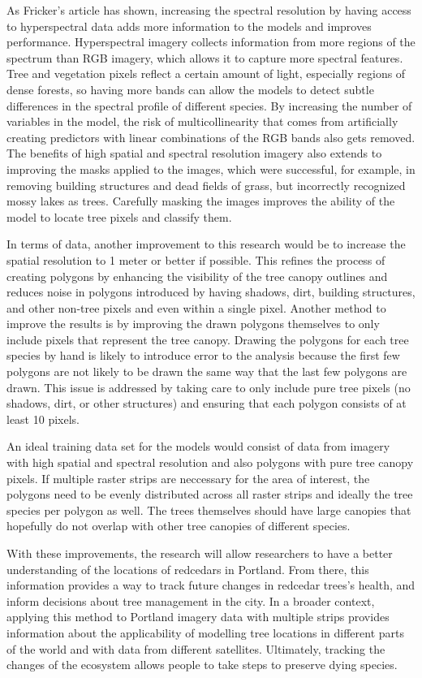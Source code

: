 \documentclass[12pt,twoside]{reedthesis}
\begin{document}
As Fricker's article has shown, increasing the spectral resolution by having access to hyperspectral data adds more information to the models and improves performance. Hyperspectral imagery collects information from more regions of the spectrum than RGB imagery, which allows it to capture more spectral features. Tree and vegetation pixels reflect a certain amount of light, especially regions of dense forests, so having more bands can allow the models to detect subtle differences in the spectral profile of different species. By increasing the number of variables in the model, the risk of multicollinearity that comes from artificially creating predictors with linear combinations of the RGB bands also gets removed. The benefits of high spatial and spectral resolution imagery also extends to improving the masks applied to the images, which were successful, for example, in removing building structures and dead fields of grass, but incorrectly recognized mossy lakes as trees. Carefully masking the images improves the ability of the model to locate tree pixels and classify them.

In terms of data, another improvement to this research would be to increase the spatial resolution to 1 meter or better if possible. This refines the process of creating polygons by enhancing the visibility of the tree canopy outlines and reduces noise in polygons introduced by having shadows, dirt, building structures, and other non-tree pixels and even within a single pixel. Another method to improve the results is by improving the drawn polygons themselves to only include pixels that represent the tree canopy. Drawing the polygons for each tree species by hand is likely to introduce error to the analysis because the first few polygons are not likely to be drawn the same way that the last few polygons are drawn. This issue is addressed by taking care to only include pure tree pixels (no shadows, dirt, or other structures) and ensuring that each polygon consists of at least 10 pixels.

An ideal training data set for the models would consist of data from imagery with high spatial and spectral resolution and also polygons with pure tree canopy pixels. If multiple raster strips are neccessary for the area of interest, the polygons need to be evenly distributed across all raster strips and ideally the tree species per polygon as well. The trees themselves should have large canopies that hopefully do not overlap with other tree canopies of different species.

With these improvements, the research will allow researchers to have a better understanding of the locations of redcedars in Portland. From there, this information provides a way to track future changes in redcedar trees's health, and inform decisions about tree management in the city. In a broader context, applying this method to Portland imagery data with multiple strips provides information about the applicability of modelling tree locations in different parts of the world and with data from different satellites. Ultimately, tracking the changes of the ecosystem allows people to take steps to preserve dying species.
\end{document}
